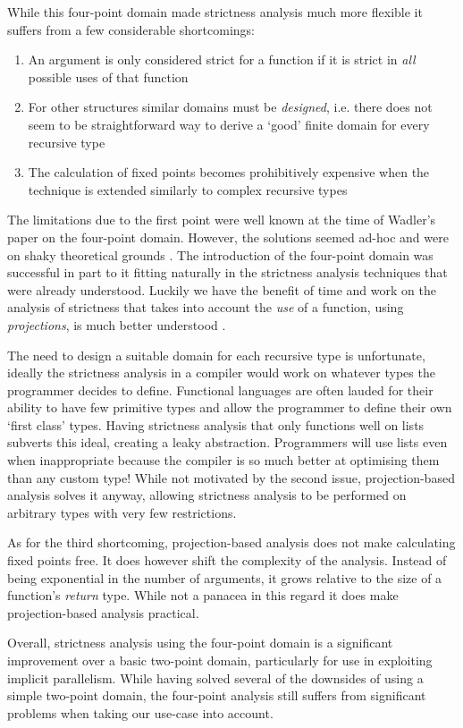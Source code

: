 While this four-point domain made strictness analysis much more flexible it
suffers from a few considerable shortcomings:

\begin{enumerate}
    \item An argument is only considered strict for a function if it is strict
        in \emph{all} possible uses of that function
    \item For other structures similar domains must be \emph{designed}, i.e.
        there does not seem to be straightforward way to derive a `good' finite
        domain for every recursive type
    \item The calculation of fixed points becomes prohibitively expensive when
        the technique is extended similarly to complex recursive types
\end{enumerate}

The limitations due to the first point were well known at the time of Wadler's
paper on the four-point domain. However, the solutions seemed ad-hoc and were
on shaky theoretical grounds . The
introduction of the four-point domain was successful in part to it fitting
naturally in the strictness analysis techniques that were already understood.
Luckily we have the benefit of time and work on the analysis of strictness that
takes into account the \emph{use} of a function, using \emph{projections}, is
much better understood \citep{hinze1995projection, SergeyDemand}.

The need to design a suitable domain for each recursive type is unfortunate,
ideally the strictness analysis in a compiler would work on whatever types the
programmer decides to define. Functional languages are often lauded for their
ability to have few primitive types and allow the programmer to define their
own `first class' types.  Having strictness analysis that only functions well
on lists subverts this ideal, creating a leaky abstraction. Programmers will
use lists even when inappropriate because the compiler is so much better at
optimising them than any custom type! While not motivated by the second issue,
projection-based analysis solves it anyway, allowing strictness analysis to be
performed on arbitrary types with very few restrictions.

As for the third shortcoming, projection-based analysis does not make
calculating fixed points free. It does however shift the complexity of the
analysis. Instead of being exponential in the number of arguments, it grows
relative to the size of a function's \emph{return} type. While not a panacea in
this regard it does make projection-based analysis practical.

Overall, strictness analysis using the four-point domain is a significant
improvement over a basic two-point domain, particularly for use in exploiting
implicit parallelism. While having solved several of the downsides of using
a simple two-point domain, the four-point analysis still suffers from
significant problems when taking our use-case into account.
